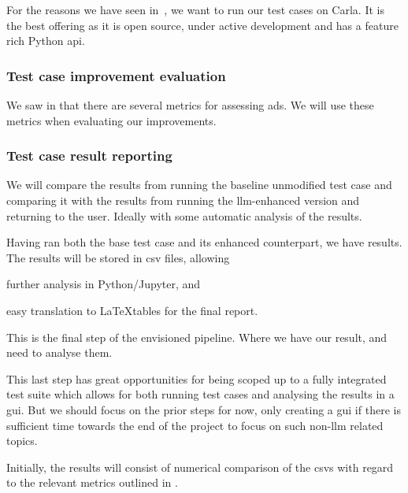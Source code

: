 For the reasons we have seen in~, we want to run our
test cases on Carla. It is the best offering as it is open source, under active
development and has a feature rich Python \acrshort{api}.

\subsubsection{Test case improvement evaluation}\label{sec:testCaseEval}

We saw in  that there are several metrics for assessing
\acrshort{ads}. We will use these metrics when evaluating our improvements.

\subsubsection{Test case result reporting}

We will compare the results from running
the baseline unmodified test case and comparing it with the results from
running the \acrshort{llm}-enhanced version and returning to the user. Ideally with
some automatic analysis of the results.

Having ran both the base test case and its enhanced counterpart, we have
results. The results will be stored in \acrfull{csv} files, allowing \begin{inparaenum}
    \item further analysis in Python/Jupyter,
    and
    \item easy translation to \LaTeX tables for the final report.
\end{inparaenum}

This is the final step of the envisioned pipeline. Where we have our result, and
need to analyse them.

This last step has great opportunities for being scoped up to a fully integrated
test suite which allows for both running test cases and analysing the results in
a \acrfull{gui}. But we should focus on the prior steps for now, only creating a
\acrshort{gui} if there is sufficient time towards the end of the project to
focus on such non-\acrshort{llm} related topics.

Initially, the results will consist of numerical comparison of the
\acrshort{csv}s with regard to the relevant metrics outlined in
.
